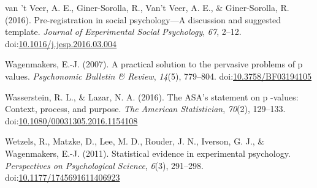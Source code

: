 \documentclass[english,man]{apa6}
\theoremstyle{definition}
\theoremstyle{definition}
\theoremstyle{definition}
\theoremstyle{remark}
\begin{document}
\hypertarget{ref-VantVeer2016}{}
van 't Veer, A. E., Giner-Sorolla, R., Van't Veer, A. E., \&
Giner-Sorolla, R. (2016). Pre-registration in social psychology---A
discussion and suggested template. \emph{Journal of Experimental Social
Psychology}, \emph{67}, 2--12.
doi:\href{https://doi.org/10.1016/j.jesp.2016.03.004}{10.1016/j.jesp.2016.03.004}

\hypertarget{ref-Wagenmakers2007}{}
Wagenmakers, E.-J. (2007). A practical solution to the pervasive
problems of p values. \emph{Psychonomic Bulletin \& Review},
\emph{14}(5), 779--804.
doi:\href{https://doi.org/10.3758/BF03194105}{10.3758/BF03194105}

\hypertarget{ref-Wasserstein2016}{}
Wasserstein, R. L., \& Lazar, N. A. (2016). The ASA's statement on p
-values: Context, process, and purpose. \emph{The American
Statistician}, \emph{70}(2), 129--133.
doi:\href{https://doi.org/10.1080/00031305.2016.1154108}{10.1080/00031305.2016.1154108}

\hypertarget{ref-Wetzels2011}{}
Wetzels, R., Matzke, D., Lee, M. D., Rouder, J. N., Iverson, G. J., \&
Wagenmakers, E.-J. (2011). Statistical evidence in experimental
psychology. \emph{Perspectives on Psychological Science}, \emph{6}(3),
291--298.
doi:\href{https://doi.org/10.1177/1745691611406923}{10.1177/1745691611406923}
\end{document}
